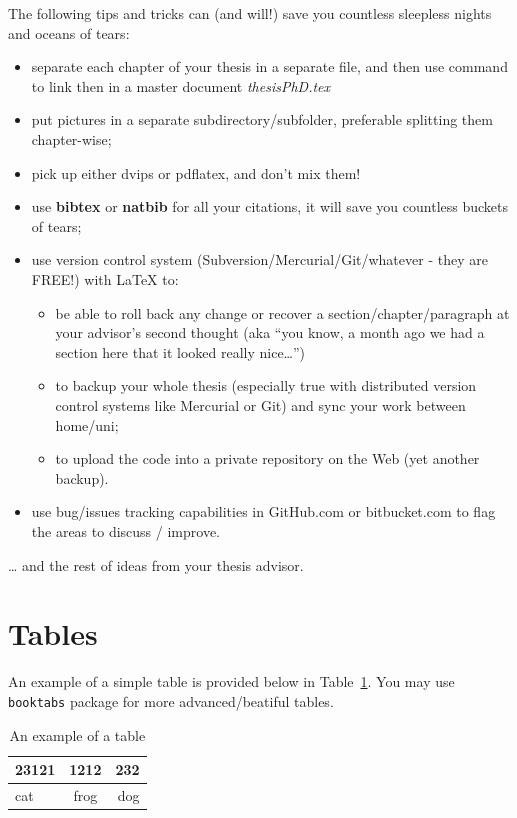 \documentclass[a4paper,11pt,phdthesis,twoside,oneandhalfspace,pdflatex]{cssethesis} %
\begin{document}
The following tips and tricks can (and will!) save you countless
sleepless nights and oceans of tears:

\begin{itemize}
\item
  separate each chapter of your thesis in a separate file, and then
  use \verb++ command to link then in a master document
  \emph{thesisPhD.tex}
\item
  put pictures in a separate subdirectory/subfolder, preferable
  splitting them chapter-wise;
\item
  pick up either dvips or pdflatex, and don't mix them!
\item
  use \textbf{bibtex} or \textbf{natbib} for all your citations, it
  will save you countless buckets of tears;
\item
  use version control system (Subversion/Mercurial/Git/whatever -
  they are FREE!) with LaTeX to:
  \begin{itemize}
  \item
    be able to roll back any change or recover a
    section/chapter/paragraph at your advisor's second thought (aka
    ``you know, a month ago we had a section here that it looked really nice\ldots{}'')
  \item
    to backup your whole thesis (especially true with distributed
    version control systems like Mercurial or Git) and sync your work
    between home/uni;
  \item
    to upload the code into a private repository on the Web (yet
    another backup).
  \end{itemize}
\item
  use bug/issues tracking capabilities in GitHub.com or bitbucket.com
  to flag the areas to discuss / improve.
\end{itemize}
\ldots{} and the rest of ideas from your thesis advisor.




\section{Tables}
An example of a simple table is provided below in Table~\ref{tab:example}. You may use \verb+booktabs+ package for more advanced/beatiful tables.

\begin{table}[ht]
	\begin{center}
	\begin{tabular}{lcr}
	23121 & 1212 & 232 \\ \hline  
	cat & frog & dog
	\end{tabular}
	\end{center}
\caption{An example of a table}
\label{tab:example}
\end{table}
\end{document}
